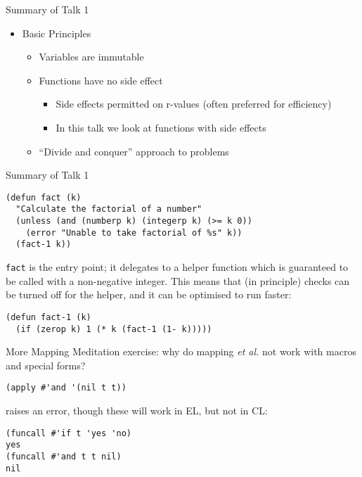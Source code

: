 \documentclass[presentation]{beamer}
\begin{document}
\begin{frame}{Summary of Talk 1}
  \begin{itemize}
  \item Basic Principles
    \begin{itemize}
    \item Variables are immutable
    \item Functions have no side effect
      \begin{itemize}
      \item Side effects permitted on r-values (often preferred for efficiency)
      \item In this talk we look at functions with side effects
      \end{itemize}
    \item ``Divide and conquer'' approach to problems
    \end{itemize}
  \end{itemize}
\end{frame}
\begin{frame}[fragile]{Summary of Talk 1}
\begin{verbatim}
(defun fact (k)
  "Calculate the factorial of a number"
  (unless (and (numberp k) (integerp k) (>= k 0))
    (error "Unable to take factorial of %s" k))
  (fact-1 k))
\end{verbatim}
\texttt{fact} is the entry point; it delegates to a helper function which is guaranteed to be called with a non-negative integer.  This means that (in principle) checks can be turned off for the helper, and it can be optimised to run faster:
\begin{verbatim}
(defun fact-1 (k)
  (if (zerop k) 1 (* k (fact-1 (1- k)))))
\end{verbatim}
\end{frame}
\begin{frame}[fragile]{More Mapping}
  Meditation exercise: why do mapping \emph{et al.} not work with macros and special forms?
\begin{verbatim}
(apply #'and '(nil t t))
\end{verbatim}
raises an error, though these will work in EL, but not in CL:
\begin{verbatim}
(funcall #'if t 'yes 'no)
yes
(funcall #'and t t nil)
nil
\end{verbatim}
\end{frame}
\end{document}
